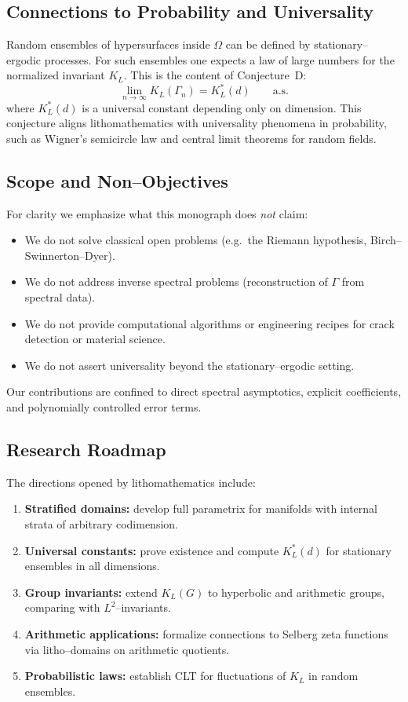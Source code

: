 \subsection{Connections to Probability and Universality}

Random ensembles of hypersurfaces inside $\Omega$ 
can be defined by stationary--ergodic processes. 
For such ensembles one expects a law of large numbers 
for the normalized invariant $K_L$. 
This is the content of Conjecture~D:
\[
\lim_{n\to\infty} K_L(\Gamma_n) = K_L^*(d) \qquad \text{a.s.}
\]
where $K_L^*(d)$ is a universal constant depending only on dimension. 
This conjecture aligns lithomathematics with universality phenomena 
in probability, such as Wigner's semicircle law 
and central limit theorems for random fields. 

\subsection{Scope and Non--Objectives}

For clarity we emphasize what this monograph does \emph{not} claim:
\begin{itemize}
\item We do not solve classical open problems 
(e.g.\ the Riemann hypothesis, Birch--Swinnerton--Dyer).
\item We do not address inverse spectral problems 
(reconstruction of $\Gamma$ from spectral data).
\item We do not provide computational algorithms or engineering recipes 
for crack detection or material science. 
\item We do not assert universality beyond the stationary--ergodic setting.
\end{itemize}
Our contributions are confined to direct spectral asymptotics, 
explicit coefficients, and polynomially controlled error terms. 

\subsection{Research Roadmap}

The directions opened by lithomathematics include:
\begin{enumerate}
\item \textbf{Stratified domains:} develop full parametrix 
for manifolds with internal strata of arbitrary codimension.
\item \textbf{Universal constants:} prove existence and compute 
$K_L^*(d)$ for stationary ensembles in all dimensions.
\item \textbf{Group invariants:} extend $K_L(G)$ to hyperbolic 
and arithmetic groups, comparing with $L^2$--invariants.
\item \textbf{Arithmetic applications:} formalize connections 
to Selberg zeta functions via litho--domains on arithmetic quotients.
\item \textbf{Probabilistic laws:} establish CLT for fluctuations 
of $K_L$ in random ensembles. 
\end{enumerate}

